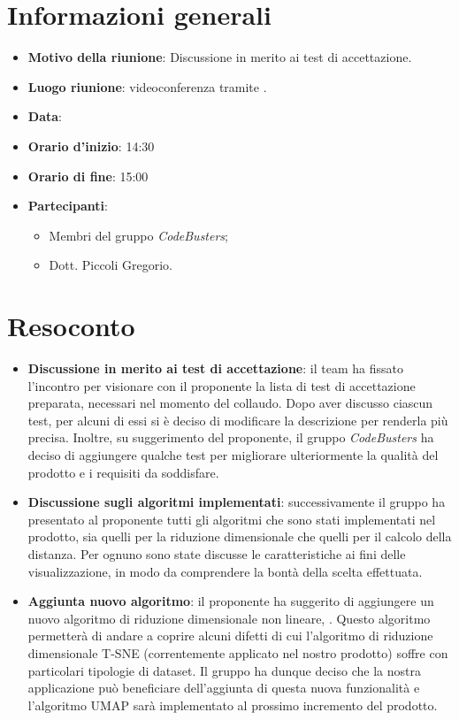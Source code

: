 \section{Informazioni generali}
\begin{itemize}
\item \textbf{Motivo della riunione}: Discussione in merito ai test di accettazione.
\item \textbf{Luogo riunione}: videoconferenza tramite .
\item \textbf{Data}: \Data{}
\item \textbf{Orario d'inizio}: 14:30 
\item \textbf{Orario di fine}: 15:00 
\item \textbf{Partecipanti}:
	\begin{itemize}
	\item Membri del gruppo \textit{CodeBusters};
	\item Dott. Piccoli Gregorio.
	\end{itemize}
\end{itemize}

\section{Resoconto}
\begin{itemize}
 	\item \textbf{Discussione in merito ai test di accettazione}:
 	 il team ha fissato l'incontro per visionare con il proponente la lista di test di accettazione preparata, necessari nel momento del collaudo. Dopo aver discusso ciascun test, per alcuni di essi si è deciso di modificare la descrizione per renderla più precisa. Inoltre, su suggerimento del proponente, il gruppo \textit{CodeBusters} ha deciso di aggiungere qualche test per migliorare ulteriormente la qualità del prodotto e i requisiti da soddisfare.
 	  
	\item \textbf{Discussione sugli algoritmi implementati}:
	successivamente il gruppo ha presentato al proponente tutti gli algoritmi che sono stati implementati nel prodotto, sia quelli per la riduzione dimensionale che quelli per il calcolo della distanza. Per ognuno sono state discusse le caratteristiche ai fini delle visualizzazione, in modo da comprendere la bontà della scelta effettuata.  

 	\item \textbf{Aggiunta nuovo algoritmo}:
il proponente ha suggerito di aggiungere un nuovo algoritmo di riduzione dimensionale non lineare, . Questo algoritmo permetterà di andare a coprire alcuni difetti di cui l'algoritmo di riduzione dimensionale T-SNE (correntemente applicato nel nostro prodotto) soffre con particolari tipologie di dataset. Il gruppo ha dunque deciso che la nostra applicazione può beneficiare dell'aggiunta di questa nuova funzionalità e l'algoritmo UMAP sarà implementato al prossimo incremento del prodotto.

\end{itemize}

\newpage